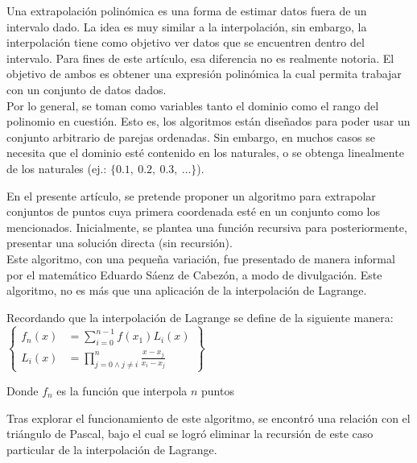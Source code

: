 
Una extrapolación polinómica es una forma de estimar datos fuera de un
intervalo dado. La idea es muy similar a la interpolación, sin embargo,
la interpolación tiene como objetivo ver datos que se encuentren dentro
del intervalo. Para fines de este artículo, esa diferencia no es realmente
notoria. El objetivo de ambos es obtener una expresión polinómica la cual
permita trabajar con un conjunto de datos dados.\\
Por lo general, se toman como variables tanto el dominio como el rango del
polinomio en cuestión. Esto es, los algoritmos están diseñados para poder
usar un conjunto arbitrario de parejas ordenadas.
Sin embargo, en muchos casos se necesita que el dominio esté contenido en
los naturales, o se obtenga linealmente de los naturales
(ej.: $\{0.1,\ 0.2,\ 0.3,\ \dots\}$). 

En el presente artículo, se pretende proponer un algoritmo para extrapolar
conjuntos de puntos cuya primera coordenada esté en un conjunto como los
mencionados. Inicialmente, se plantea una
función recursiva para posteriormente, presentar una solución directa (sin recursión).\\
Este algoritmo, con una pequeña variación, fue presentado de manera informal
por el matemático Eduardo Sáenz de Cabezón, a modo de divulgación.
Este algoritmo, no es más que una aplicación de la interpolación de Lagrange.\\

\begin{center}
    Recordando que la interpolación de Lagrange se define de la siguiente manera:\\[20pt]
$
\left\{
\begin{aligned}
    f_n(x) &= \sum_{i=0}^{n-1}f(x_1)L_i(x)\\
    L_i(x) &= \prod_{j = 0 \land j \not= i}^{n} \frac{x - x_j}{x_i - x_j}
\end{aligned}
\right\}
$

    Donde $f_n$ es la función que interpola $n$ puntos
\end{center}

Tras explorar el funcionamiento de este algoritmo, se encontró una relación
con el triángulo de Pascal, bajo el cual se logró eliminar la recursión de
este caso particular de la interpolación de Lagrange. 
